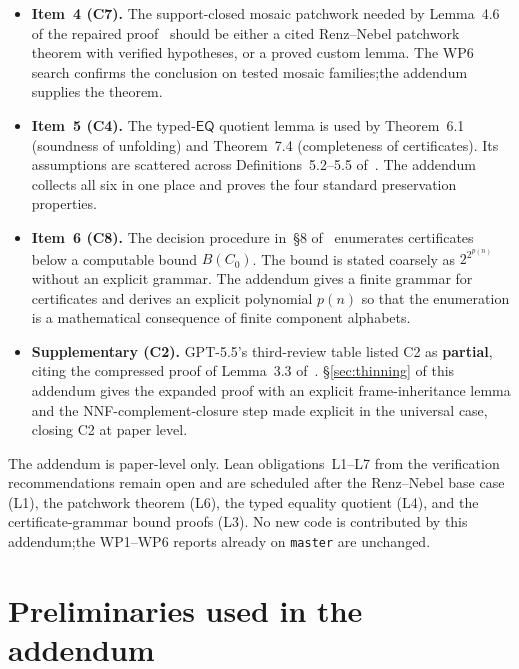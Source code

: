\documentclass[11pt]{article}
\newcommand{\EQ}{\mathsf{EQ}}
\newcommand{\PARTIAL}{\textcolor{black!60!orange}{\textbf{partial}}}
\begin{document}
\begin{itemize}[leftmargin=2em]
  \item \textbf{Item~4 (C7).}  The support-closed mosaic patchwork
    needed by Lemma~4.6 of the repaired
    proof~\cite{repaired} should be either a cited Renz--Nebel
    patchwork theorem with verified hypotheses, or a proved custom
    lemma.  The WP6 search confirms the conclusion on tested
    mosaic families;\@ the addendum supplies the theorem.
  \item \textbf{Item~5 (C4).}  The typed-\(\EQ\) quotient lemma is
    used by Theorem~6.1 (soundness of unfolding) and
    Theorem~7.4 (completeness of certificates).  Its assumptions
    are scattered across Definitions~5.2--5.5 of~\cite{repaired}.
    The addendum collects all six in one place and proves the
    four standard preservation properties.
  \item \textbf{Item~6 (C8).}  The decision procedure in~\S8
    of~\cite{repaired} enumerates certificates below a computable
    bound \(B(C_0)\).  The bound is stated coarsely as
    \(2^{2^{p(n)}}\) without an explicit grammar.  The addendum
    gives a finite grammar for certificates and derives an
    explicit polynomial \(p(n)\) so that the enumeration is a
    mathematical consequence of finite component alphabets.
  \item \textbf{Supplementary (C2).}  GPT-5.5's third-review table
    listed C2 as \PARTIAL{}, citing the compressed proof of
    Lemma~3.3 of~\cite{repaired}.  \S\ref{sec:thinning} of this
    addendum gives the expanded proof with an explicit
    frame-inheritance lemma and the NNF-complement-closure step
    made explicit in the universal case, closing C2 at paper level.
\end{itemize}

The addendum is paper-level only.  Lean obligations~L1--L7 from the
verification recommendations remain open and are scheduled after
the Renz--Nebel base case (L1), the patchwork theorem (L6), the
typed equality quotient (L4), and the certificate-grammar bound
proofs (L3).  No new code is contributed by this addendum;\@ the
WP1--WP6 reports already on \texttt{master} are unchanged.

\section{Preliminaries used in the addendum}
\end{document}
